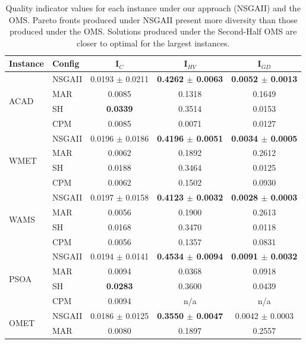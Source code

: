 \documentclass[conference]{IEEEtran}
\begin{document}
\begin{table}[htbp]
	\scriptsize
  \centering
  \caption{Quality indicator values for each instance under our approach (NSGAII) and the OMS. Pareto fronts produced under NSGAII present more diversity than those produced under the OMS. Solutions produced under the Second-Half OMS are closer to optimal for the largest instances.}
    \begin{tabular}{p{0.7cm} p{0.7cm} ccc}
    \toprule
    \textbf{Instance} & \textbf{Config} & \textbf{I$_{C}$} & \textbf{I$_{HV}$} & \textbf{I$_{GD}$} \\
    \midrule
    \multirow{4}[2]{*}{ACAD} & NSGAII & 0.0193 $\pm$ 0.0211 & \textbf{0.4262 $\pm$ 0.0063} & \textbf{0.0052 $\pm$ 0.0013} \\
          & MAR   & 0.0085 & 0.1318 & 0.1649 \\
          & SH    & \textbf{0.0339} & 0.3514 & 0.0153 \\
          & CPM   & 0.0085 & 0.0071 & 0.0127 \\\hline
    \multirow{4}[2]{*}{WMET} & NSGAII & 0.0196 $\pm$ 0.0186 & \textbf{0.4196 $\pm$ 0.0051} & \textbf{0.0034 $\pm$ 0.0005} \\
          & MAR   & 0.0062 & 0.1892 & 0.2612 \\
          & SH    & 0.0188 & 0.3464 & 0.0125 \\
          & CPM   & 0.0062 & 0.1502 & 0.0930 \\\hline
    \multirow{4}[2]{*}{WAMS} & NSGAII & 0.0197 $\pm$ 0.0158 & \textbf{0.4123 $\pm$ 0.0032} & \textbf{0.0028 $\pm$ 0.0003} \\
          & MAR   & 0.0056 & 0.1900 & 0.2613 \\
          & SH    & 0.0168 & 0.3470 & 0.0118 \\
          & CPM   & 0.0056 & 0.1357 & 0.0831 \\\hline
    \multirow{4}[2]{*}{PSOA} & NSGAII & 0.0194 $\pm$ 0.0141 & \textbf{0.4534 $\pm$ 0.0094} & \textbf{0.0091 $\pm$ 0.0032} \\
          & MAR   & 0.0094 & 0.0368 & 0.0918 \\
          & SH    & \textbf{0.0283} & 0.3600 & 0.0439 \\
          & CPM   & 0.0094 & n/a   & n/a \\\hline
    \multirow{4}[2]{*}{OMET} & NSGAII & 0.0186 $\pm$ 0.0125 & \textbf{0.3550 $\pm$ 0.0047} & 0.0042 $\pm$ 0.0003 \\
          & MAR   & 0.0080 & 0.1897 & 0.2557 \\

\end{tabular}
\end{table}
\end{document}
